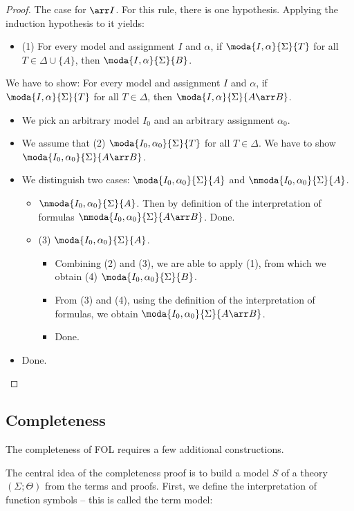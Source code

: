 \begin{proof}
\noindent The case for $\arr I$. For this rule, there is one hypothesis. Applying the induction hypothesis to it yields:
\begin{itemize}
\item (1) For every model and assignment $I$ and $\alpha$, if $\moda{I,\alpha}{\Sigma}{T}$ for all $T\in\Delta\cup\{A\}$, then $\moda{I,\alpha}{\Sigma}{B}$.
\end{itemize}
We have to show: For every model and assignment $I$ and $\alpha$, if $\moda{I,\alpha}{\Sigma}{T}$ for all $T\in\Delta$, then $\moda{I,\alpha}{\Sigma}{A\arr B}$.
\begin{itemize}
\item We pick an arbitrary model $I_0$ and an arbitrary assignment $\alpha_0$.
\item We assume that (2) $\moda{I_0,\alpha_0}{\Sigma}{T}$ for all $T\in\Delta$. We have to show $\moda{I_0,\alpha_0}{\Sigma}{A\arr B}$.
\item We distinguish two cases: $\moda{I_0,\alpha_0}{\Sigma}{A}$ and $\nmoda{I_0,\alpha_0}{\Sigma}{A}$.
\begin{itemize}
\item $\nmoda{I_0,\alpha_0}{\Sigma}{A}$. Then by definition of the interpretation of formulas $\nmoda{I_0,\alpha_0}{\Sigma}{A\arr B}$. Done.
\item (3) $\moda{I_0,\alpha_0}{\Sigma}{A}$.
  \begin{itemize}
    \item Combining (2) and (3), we are able to apply (1), from which we obtain (4) $\moda{I_0,\alpha_0}{\Sigma}{B}$.
    \item From (3) and (4), using the definition of the interpretation of formulas, we obtain $\moda{I_0,\alpha_0}{\Sigma}{A\arr B}$.
    \item Done.
  \end{itemize}
\end{itemize}
\item Done.
\end{itemize}
\end{proof}

\subsection{Completeness}

The completeness of FOL requires a few additional constructions.

The central idea of the completeness proof is to build a model $S$ of a theory $(\Sigma;\Theta)$ from the terms and proofs.
First, we define the interpretation of function symbols -- this is called the term model:

